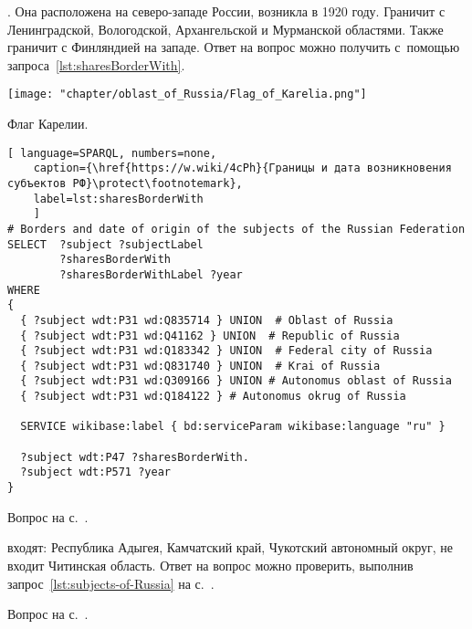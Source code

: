 \begin{task}
\label{answer:subjects_of_Russia_1}
. 
    Она расположена на северо-западе России, возникла в \num{1920} году. 
    Граничит с Ленинградской, Вологодской, Архангельской и Мурманской областями. 
    Также граничит с Финляндией на западе.  
    Ответ на вопрос можно получить с~помощью запроса~\ref{lst:sharesBorderWith}.
	
\begin{marginfigure}[0.0cm]
\centering\texttt{[image: "chapter/oblast\_of\_Russia/Flag\_of\_Karelia.png"]}
\caption [Флаг Карелии, Россия.]{Флаг Карелии.}%
\label{fig:Flag_of_Karelia}%
\end{marginfigure}

	
\begin{lstlisting}[ language=SPARQL, numbers=none,
	caption={\href{https://w.wiki/4cPh}{Границы и дата возникновения субъектов РФ}\protect\footnotemark},
	label=lst:sharesBorderWith
	]
# Borders and date of origin of the subjects of the Russian Federation
SELECT  ?subject ?subjectLabel 
        ?sharesBorderWith 
        ?sharesBorderWithLabel ?year
WHERE
{
  { ?subject wdt:P31 wd:Q835714 } UNION  # Oblast of Russia
  { ?subject wdt:P31 wd:Q41162 } UNION  # Republic of Russia
  { ?subject wdt:P31 wd:Q183342 } UNION  # Federal city of Russia
  { ?subject wdt:P31 wd:Q831740 } UNION  # Krai of Russia
  { ?subject wdt:P31 wd:Q309166 } UNION # Autonomus oblast of Russia
  { ?subject wdt:P31 wd:Q184122 } # Autonomus okrug of Russia
  
  SERVICE wikibase:label { bd:serviceParam wikibase:language "ru" }
  
  ?subject wdt:P47 ?sharesBorderWith. 
  ?subject wdt:P571 ?year
}
\end{lstlisting}
	
\small{Вопрос на с.~\pageref{lst:sharesBorderWith-oblast-of-Russia}.}
\end{task}



\begin{task}
	\label{answer:subjects_of_Russia_2}
     входят: Республика Адыгея, 
    Камчатский край, Чукотский автономный округ, не входит Читинская область. 
    Ответ на вопрос можно проверить, 
    выполнив запрос~\ref{lst:subjects-of-Russia} на с.~\pageref{lst:subjects-of-Russia}.

\small{Вопрос на с.~\pageref{lst:sharesBorderWith-empty-oblast-of-Russia}.}
\end{task}




